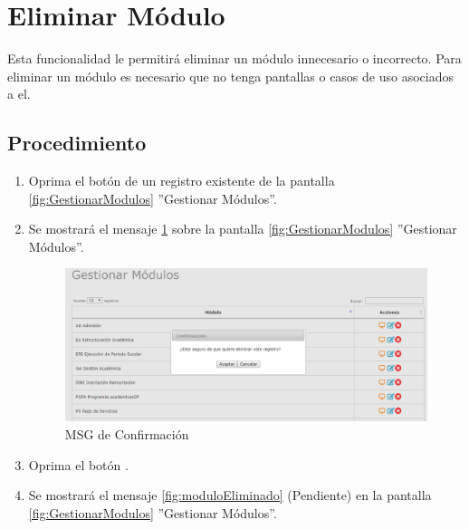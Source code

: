 \hypertarget{cv:eliminarModulo}{\section{Eliminar Módulo}} \label{sec:eliminarMo dulo}

	Esta funcionalidad le permitirá eliminar un módulo innecesario o incorrecto. Para eliminar un módulo es necesario que no tenga pantallas o casos de uso asociados a el.

		\subsection{Procedimiento}

			\begin{enumerate}
	
			\item Oprima el botón \IUBotonEliminar{} de un registro existente de la pantalla \ref{fig:GestionarModulos} ''Gestionar Módulos''.
	
			\item Se mostrará el mensaje \ref{fig:confirmaEliminaModulo} sobre la pantalla \ref{fig:GestionarModulos} ''Gestionar Módulos''.
			
			\begin{figure}[htbp!]
				\begin{center}
					\includegraphics[scale=0.6]{roles/lider/modulos/pantallas/IU5-3MSG10}
					\caption{MSG de Confirmación}
					\label{fig:confirmaEliminaModulo}
				\end{center}
			\end{figure}
						
			\item Oprima el botón \IUAceptar.
			
			\item Se mostrará el mensaje \ref{fig:moduloEliminado}  (Pendiente) en la pantalla \ref{fig:GestionarModulos} ''Gestionar Módulos''.
			

\end{enumerate}

